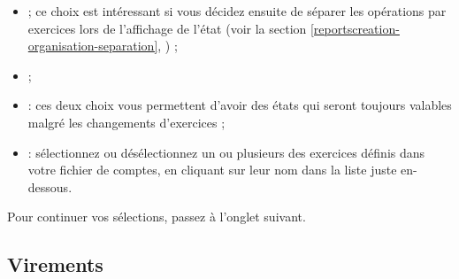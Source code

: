 \begin{itemize}
	\ifIllustration
	\label{reportcreation-datas-financialyear-img}
	\fi
    \item {} ; ce choix est intéressant si vous décidez ensuite de séparer les opérations par exercices lors de l'affichage de l'état (voir la section \vref{reportscreation-organisation-separation}, ) ;
    \item {} ;
    \item {} : ces deux choix vous permettent d'avoir des états qui seront toujours valables malgré les changements d'exercices ;
    \item {} : sélectionnez ou désélectionnez un ou plusieurs des exercices définis dans votre fichier de comptes, en cliquant sur leur nom dans la liste juste en-dessous.
\end{itemize}

\ifIllustration
\else
\fi

Pour continuer vos sélections, passez à l'onglet suivant.

\ifIllustration
\fi


\subsection{Virements\label{reportscreation-selection-transfer}}

